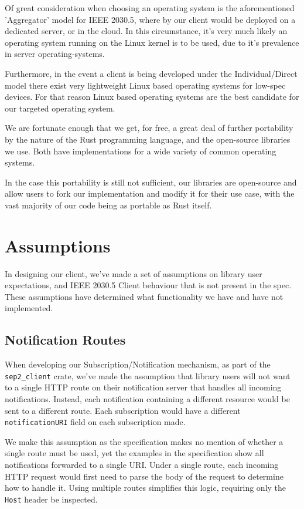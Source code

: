 Of great consideration when choosing an operating system is the aforementioned 'Aggregator' model for IEEE 2030.5, where by our client would be deployed on a dedicated server, or in the cloud. In this circumstance, it's very much likely an operating system running on the Linux kernel is to be used, due to it's prevalence in server operating-systems.

Furthermore, in the event a client is being developed under the Individual/Direct model there exist very lightweight Linux based operating systems for low-spec devices. For that reason Linux based operating systems are the best candidate for our targeted operating system.

We are fortunate enough that we get, for free, a great deal of further portability by the nature of the Rust programming language, and the open-source libraries we use. Both have implementations for a wide variety of common operating systems. \cite{RustPlatforms} \cite{TokioDocs}

In the case this portability is still not sufficient, our libraries are open-source and allow users to fork our implementation and modify it for their use case, with the vast majority of our code being as portable as Rust itself.
    
\section{Assumptions}
In designing our client, we've made a set of assumptions on library user expectations, and IEEE 2030.5 Client behaviour that is not present in the spec. These assumptions have determined what functionality we have and have not implemented.

\subsection{Notification Routes}
When developing our Subscription/Notification mechanism, as part of the \texttt{sep2\_client} crate, we've made the assumption that library users will not want to a single HTTP route on their notification server that handles all incoming notifications. Instead, each notification containing a different resource would be sent to a different route. Each subscription would have a different \texttt{notificationURI} field on each subscription made.

We make this assumption as the specification makes no mention of whether a single route must be used, yet the examples in the specification show all notifications forwarded to a single URI. Under a single route, each incoming HTTP request would first need to parse the body of the request to determine how to handle it. Using multiple routes simplifies this logic, requiring only the \texttt{Host} header be inspected. 

